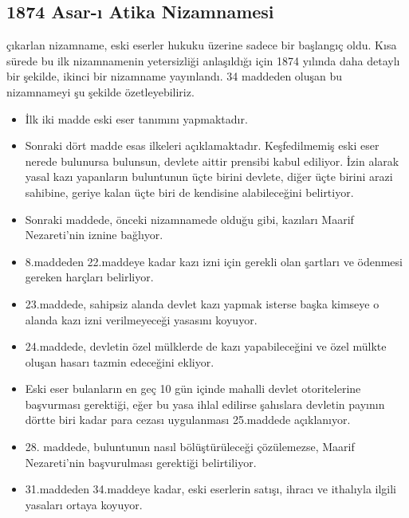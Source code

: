 \subsection{1874 Asar-ı Atika Nizamnamesi}
\indent{} çıkarlan nizamname, eski eserler hukuku üzerine sadece bir başlangıç oldu. Kısa sürede bu ilk nizamnamenin yetersizliği anlaşıldığı için 1874 yılında daha detaylı bir şekilde, ikinci bir nizamname yayınlandı. 34 maddeden oluşan bu nizamnameyi şu şekilde özetleyebiliriz.\cite{mumcu_2}
\begin{itemize}
    \item İlk iki madde eski eser tanımını yapmaktadır.
    \item Sonraki dört madde esas ilkeleri açıklamaktadır. Keşfedilmemiş eski eser nerede bulunursa bulunsun, devlete aittir prensibi kabul ediliyor. İzin alarak yasal kazı yapanların buluntunun üçte birini devlete, diğer üçte birini arazi sahibine, geriye kalan üçte biri de kendisine alabileceğini belirtiyor.
    \item Sonraki maddede, önceki nizamnamede olduğu gibi, kazıları Maarif Nezareti'nin iznine bağlıyor.
    \item 8.maddeden 22.maddeye kadar kazı izni için gerekli olan şartları ve ödenmesi gereken harçları belirliyor.
    \item 23.maddede, sahipsiz alanda devlet kazı yapmak isterse başka kimseye o alanda kazı izni verilmeyeceği yasasını koyuyor.
    \item 24.maddede, devletin özel mülklerde de kazı yapabileceğini ve özel mülkte oluşan hasarı tazmin edeceğini ekliyor.
    \item Eski eser bulanların en geç 10 gün içinde mahalli devlet otoritelerine başvurması gerektiği, eğer bu yasa ihlal edilirse şahıslara devletin payının dörtte biri kadar para cezası uygulanması 25.maddede açıklanıyor.
    \item 28. maddede, buluntunun nasıl bölüştürüleceği çözülemezse, Maarif Nezareti'nin başvurulması gerektiği belirtiliyor.
    \item 31.maddeden 34.maddeye kadar, eski eserlerin satışı, ihracı ve ithalıyla ilgili yasaları ortaya koyuyor.
\end{itemize}